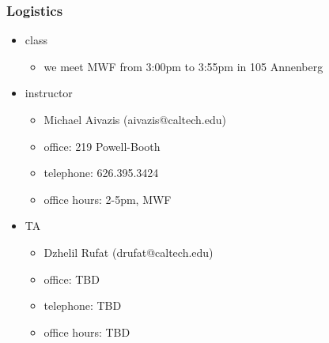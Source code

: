 %
%


\begin{frame}[fragile]
%
  \frametitle{Logistics}
%
  \begin{itemize}
%
  \item class
    \begin{itemize}
    \item we meet MWF from 3:00pm to 3:55pm in 105 Annenberg
    \end{itemize}
%
  \item instructor
    \begin{itemize}
    \item Michael Aivazis (aivazis@caltech.edu)
    \item office: 219 Powell-Booth
    \item telephone: 626.395.3424
    \item office hours: 2-5pm, MWF  
    \end{itemize}
%
  \item TA
    \begin{itemize}
    \item Dzhelil Rufat (drufat@caltech.edu)
    \item office: TBD
    \item telephone: TBD
    \item office hours: TBD
    \end{itemize}
%
  \end{itemize}
%
\end{frame}

